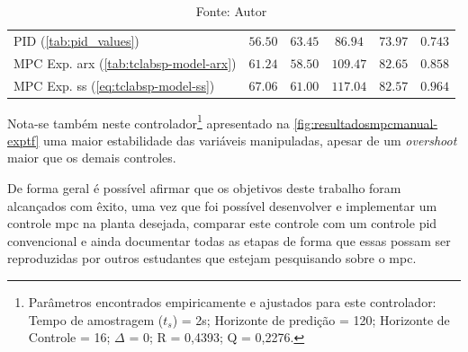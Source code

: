 \begin{table}[!h]
\begin{tabular}{l|cccc|c}
		PID (\cref{tab:pid_values})	                                        &   $56.50$           												&   $63.45$          											&   $86.94$          														&   $73.97$														&   $0.743$             														\\ 
		MPC Exp. \acrshort{arx}	(\cref{tab:tclabsp-model-arx})				&   $61.24$           												&   $58.50$          											&   $109.47$         														&   $82.65$														&   $0.858$             														\\ 
		MPC Exp. \acrshort{ss} (\cref{eq:tclabsp-model-ss})					&   $67.06$           												&   $61.00$          											&   $117.04$         														&   $82.57$														&   $0.964$             														\\ \bottomrule 
	\end{tabular}
	\caption*{Fonte: Autor}
\end{table}

Nota-se também neste controlador\footnote{
    Parâmetros encontrados empiricamente e ajustados para este controlador: Tempo de amostragem ($t_s$) = 2s; Horizonte de predição = 120;
    Horizonte de Controle = 16; $\Delta$ = 0; R = 0,4393; Q = 0,2276.
} apresentado na \cref{fig:resultadosmpcmanual-exptf} uma maior estabilidade
das variáveis manipuladas, apesar de um \textit{overshoot} maior que os demais controles.

De forma geral é possível afirmar que os objetivos deste trabalho foram alcançados com êxito, uma vez que foi
possível desenvolver e implementar um controle \acrshort{mpc} na planta desejada, comparar este controle 
com um controle \acrshort{pid} convencional e ainda documentar todas as etapas de forma que essas possam ser reproduzidas
por outros estudantes que estejam pesquisando sobre o \acrlong{mpc}.


